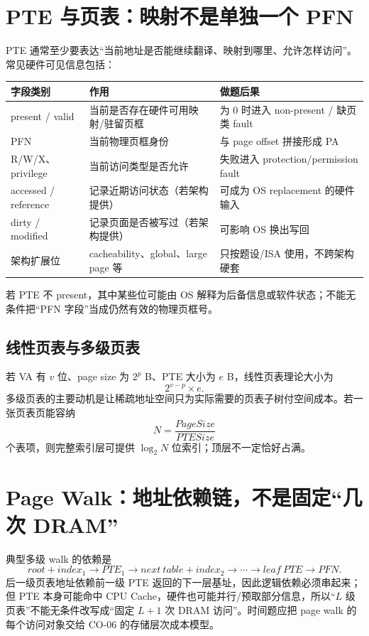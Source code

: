 \documentclass[UTF8,fontset=fandol,11pt,a4paper]{ctexart}
\begin{document}
\section{PTE 与页表：映射不是单独一个 PFN}
PTE 通常至少要表达“当前地址是否能继续翻译、映射到哪里、允许怎样访问”。常见硬件可见信息包括：
\begin{center}\small
\begin{tabularx}{\linewidth}{L{2.8cm}YY}
\toprule
字段类别 & 作用 & 做题后果\\\midrule
present / valid & 当前是否存在硬件可用映射/驻留页框 & 为 0 时进入 non-present / 缺页类 fault\\
PFN & 当前物理页框身份 & 与 page offset 拼接形成 PA\\
R/W/X、privilege & 当前访问类型是否允许 & 失败进入 protection/permission fault\\
accessed / reference & 记录近期访问状态（若架构提供） & 可成为 OS replacement 的硬件输入\\
dirty / modified & 记录页面是否被写过（若架构提供） & 可影响 OS 换出写回\\
架构扩展位 & cacheability、global、large page 等 & 只按题设/ISA 使用，不跨架构硬套\\
\bottomrule
\end{tabularx}
\end{center}
若 PTE 不 present，其中某些位可能由 OS 解释为后备信息或软件状态；不能无条件把“PFN 字段”当成仍然有效的物理页框号。

\subsection{线性页表与多级页表}
若 VA 有 $v$ 位、page size 为 $2^p$ B、PTE 大小为 $e$ B，线性页表理论大小为
\[
2^{v-p}\times e.
\]
多级页表的主要动机是让稀疏地址空间只为实际需要的页表子树付空间成本。若一张页表页能容纳
\[
N=\frac{PageSize}{PTESize}
\]
个表项，则完整索引层可提供 $\log_2N$ 位索引；顶层不一定恰好占满。

\section{Page Walk：地址依赖链，不是固定“几次 DRAM”}
典型多级 walk 的依赖是
\[
root+index_1
\to PTE_1
\to next\ table+index_2
\to\cdots
\to leaf\ PTE
\to PFN.
\]
后一级页表地址依赖前一级 PTE 返回的下一层基址，因此逻辑依赖必须串起来；但 PTE 本身可能命中 CPU Cache，硬件也可能并行/预取部分信息，所以“$L$ 级页表”不能无条件改写成“固定 $L+1$ 次 DRAM 访问”。时间题应把 page walk 的每个访问对象交给 CO-06 的存储层次成本模型。
\end{document}
